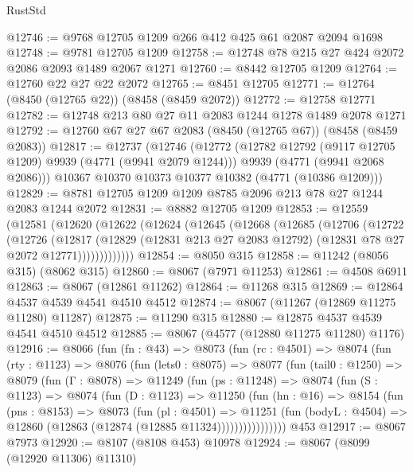\begin{lexlean}{RustStd}
\begin{coremodule}
@12746 := @9768 @12705 @1209 @266 @412 @425 @61 @2087 @2094 @1698
@12748 := @9781 @12705 @1209
@12758 := @12748 @78 @215 @27 @424 @2072 @2086 @2093 @1489 @2067 @1271
@12760 := @8442 @12705 @1209
@12764 := @12760 @22 @27 @22 @2072
@12765 := @8451 @12705
@12771 := @12764 (@8450 (@12765 @22)) (@8458 (@8459 @2072))
@12772 := @12758 @12771
@12782 := @12748 @213 @80 @27 @11 @2083 @1244 @1278 @1489 @2078 @1271
@12792 := @12760 @67 @27 @67 @2083 (@8450 (@12765 @67)) (@8458 (@8459 @2083))
@12817 := @12737
    (@12746
      (@12772
        (@12782 @12792 (@9117 @12705 @1209) @9939 (@4771 (@9941 @2079 @1244)))
        @9939
        (@4771 (@9941 @2068 @2086)))
      @10367
      @10370
      @10373
      @10377
      @10382
      (@4771 (@10386 @1209)))
@12829 := @8781 @12705 @1209 @1209 @8785 @2096 @213 @78 @27 @1244 @2083 @1244 @2072
@12831 := @8882 @12705 @1209
@12853 := @12559
    (@12581
      (@12620
        (@12622
          (@12624
            (@12645
              (@12668
                (@12685
                  (@12706
                    (@12722
                      (@12726
                        (@12817
                          (@12829
                            (@12831 @213 @27 @2083 @12792)
                            (@12831 @78 @27 @2072 @12771)))))))))))))
@12854 := @8050 @315
@12858 := @11242 (@8056 @315) (@8062 @315)
@12860 := @8067 (@7971 @11253)
@12861 := @4508 @6911
@12863 := @8067 (@12861 @11262)
@12864 := @11268 @315
@12869 := @12864 @4537 @4539 @4541 @4510 @4512
@12874 := @8067 (@11267 (@12869 @11275 @11280) @11287)
@12875 := @11290 @315
@12880 := @12875 @4537 @4539 @4541 @4510 @4512
@12885 := @8067 (@4577 (@12880 @11275 @11280) @1176)
@12916 := @8066
    (fun (fn : @43) =>
    @8073
      (fun (rc : @4501) =>
      @8074
        (fun (rty : @1123) =>
        @8076
          (fun (lets0 : @8075) =>
          @8077
            (fun (tail0 : @1250) =>
            @8079
              (fun (Γ : @8078) =>
              @11249
                (fun (ps : @11248) =>
                @8074
                  (fun (S : @1123) =>
                  @8074
                    (fun (D : @1123) =>
                    @11250
                      (fun (hn : @16) =>
                      @8154
                        (fun (pns : @8153) =>
                        @8073
                          (fun (pl : @4501) =>
                          @11251
                            (fun (bodyL : @4504) =>
                            @12860 (@12863 (@12874 (@12885 @11324))))))))))))))))
    @453
@12917 := @8067 @7973
@12920 := @8107 (@8108 @453) @10978
@12924 := @8067 (@8099 (@12920 @11306) @11310)

\end{coremodule}
\end{lexlean}
